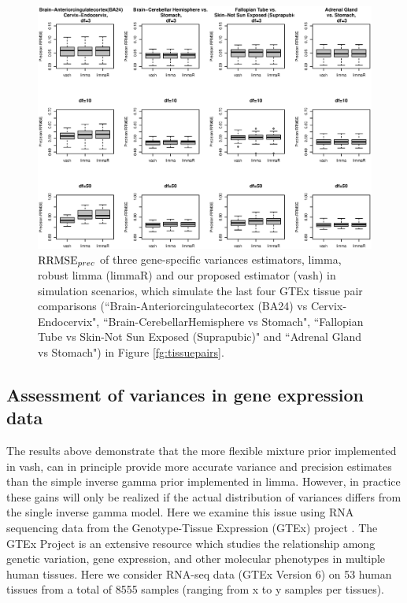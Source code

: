 \documentclass{bioinfo}
\begin{document}
\begin{figure}[!hbp]
\includegraphics[width=\linewidth]{rmse_gtex.eps}
\caption{$\textrm{RRMSE}_{prec}$ of three gene-specific variances estimators, limma, robust limma (limmaR) and our proposed estimator (vash) in simulation scenarios, which simulate the last four GTEx tissue pair comparisons (``Brain-Anteriorcingulatecortex (BA24) vs Cervix-Endocervix", ``Brain-CerebellarHemisphere vs Stomach", ``Fallopian Tube vs Skin-Not Sun Exposed (Suprapubic)" and ``Adrenal Gland vs Stomach") in Figure \ref{fg:tissuepairs}.}
\label{fg:rmsegtex}
\end{figure}

\subsection{Assessment of variances in gene expression data}

The results above demonstrate that the more flexible mixture prior implemented in vash, can in principle provide more accurate variance and precision estimates than
the simple inverse gamma prior implemented in limma. However, in practice these gains will only be realized if the actual distribution of variances differs from the single inverse gamma model. Here
we examine  this issue using RNA sequencing data from the Genotype-Tissue Expression (GTEx) project \citep{gtex}. The GTEx Project is an extensive resource which studies the relationship among genetic variation, gene expression, and other molecular phenotypes in multiple human tissues. Here we consider RNA-seq data (GTEx Version 6) on 53 human tissues from a total of 8555 samples (ranging from x to y samples per tissues).
 
\end{document}
